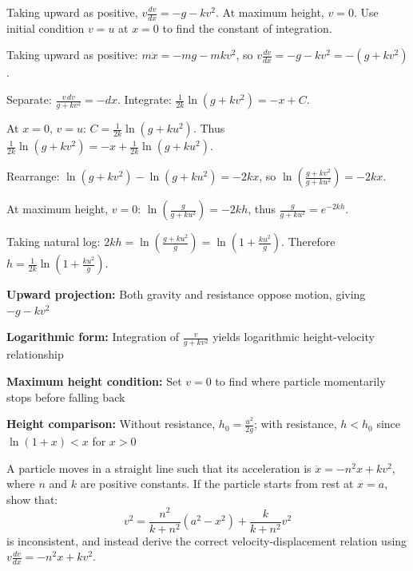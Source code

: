 \begin{hint}
Taking upward as positive, $v\frac{dv}{dx} = -g - kv^2$. At maximum height, $v = 0$. Use initial condition $v = u$ at $x = 0$ to find the constant of integration.
\end{hint}

\begin{solution}
Taking upward as positive: $m\ddot{x} = -mg - mkv^2$, so $v\frac{dv}{dx} = -g - kv^2 = -(g + kv^2)$.

Separate: $\frac{v\,dv}{g + kv^2} = -dx$. Integrate: $\frac{1}{2k}\ln(g + kv^2) = -x + C$.

At $x = 0$, $v = u$: $C = \frac{1}{2k}\ln(g + ku^2)$. Thus $\frac{1}{2k}\ln(g + kv^2) = -x + \frac{1}{2k}\ln(g + ku^2)$.

Rearrange: $\ln(g + kv^2) - \ln(g + ku^2) = -2kx$, so $\ln\left(\frac{g + kv^2}{g + ku^2}\right) = -2kx$.

At maximum height, $v = 0$: $\ln\left(\frac{g}{g + ku^2}\right) = -2kh$, thus $\frac{g}{g + ku^2} = e^{-2kh}$.

Taking natural log: $2kh = \ln\left(\frac{g + ku^2}{g}\right) = \ln\left(1 + \frac{ku^2}{g}\right)$. Therefore $h = \frac{1}{2k}\ln\left(1 + \frac{ku^2}{g}\right)$.
\end{solution}

\begin{takeaways}
\item \textbf{Upward projection:} Both gravity and resistance oppose motion, giving $-g - kv^2$
\item \textbf{Logarithmic form:} Integration of $\frac{v}{g + kv^2}$ yields logarithmic height-velocity relationship
\item \textbf{Maximum height condition:} Set $v = 0$ to find where particle momentarily stops before falling back
\item \textbf{Height comparison:} Without resistance, $h_0 = \frac{u^2}{2g}$; with resistance, $h < h_0$ since $\ln(1+x) < x$ for $x > 0$
\end{takeaways}

\begin{problem}
A particle moves in a straight line such that its acceleration is $\ddot{x} = -n^2x + kv^2$, where $n$ and $k$ are positive constants. If the particle starts from rest at $x = a$, show that:
\[
v^2 = \frac{n^2}{k+n^2}(a^2 - x^2) + \frac{k}{k+n^2}v^2
\]
is inconsistent, and instead derive the correct velocity-displacement relation using $v\frac{dv}{dx} = -n^2x + kv^2$.
\end{problem}

